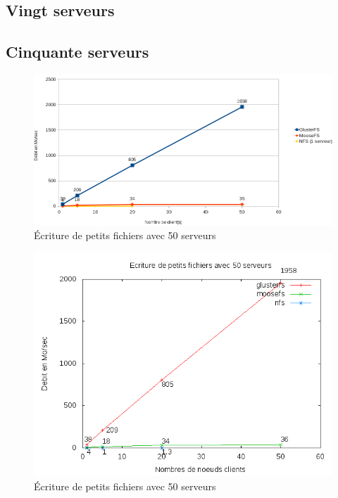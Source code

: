 \documentclass[12pt]{report}
\begin{document}
			\subsection{Vingt serveurs}

			\subsection{Cinquante serveurs}


		        \begin{figure}[H]
			        \begin{center}
				        \includegraphics[width=1\linewidth]{graph/calc/50WS.png}
				        \caption{Écriture de petits fichiers avec 50 serveurs}
			        \end{center}
		        \end{figure}
\begin{figure}[H]
\begin{center}
\includegraphics[bb=0 0 640 480,width=14cm]{images/srv50ws.png}
\caption{Écriture de petits fichiers avec 50 serveurs}
\end{center}
\end{figure} 
\end{document}
